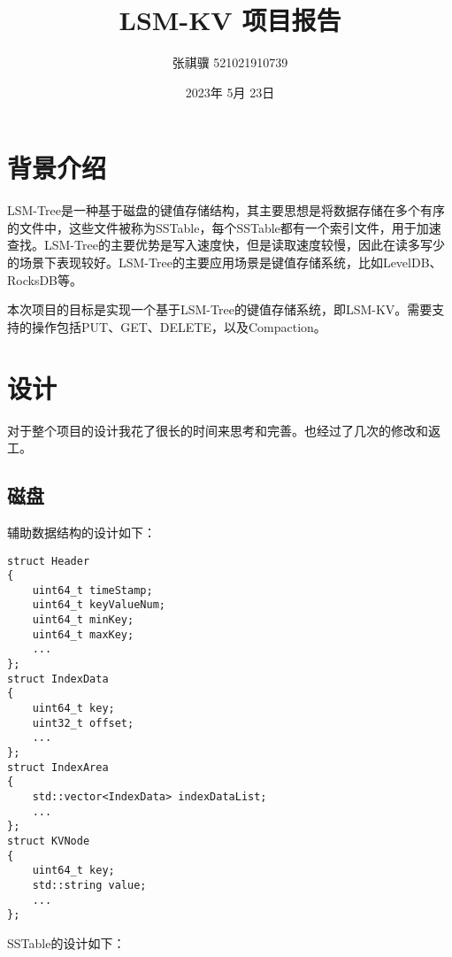 \documentclass[fontset=windows]{article}
\title{LSM-KV 项目报告}
\author{张祺骥 521021910739}
\date{2023年 5月 23日}
\begin{document}
\maketitle

\section{背景介绍}
LSM-Tree是一种基于磁盘的键值存储结构，其主要思想是将数据存储在多个有序的文件中，这些文件被称为SSTable，每个SSTable都有一个索引文件，用于加速查找。LSM-Tree的主要优势是写入速度快，但是读取速度较慢，因此在读多写少的场景下表现较好。LSM-Tree的主要应用场景是键值存储系统，比如LevelDB、RocksDB等。

本次项目的目标是实现一个基于LSM-Tree的键值存储系统，即LSM-KV。需要支持的操作包括PUT、GET、DELETE，以及Compaction。

\section{设计}

对于整个项目的设计我花了很长的时间来思考和完善。也经过了几次的修改和返工。

\subsection{磁盘}

辅助数据结构的设计如下：

\begin{lstlisting}
struct Header
{
    uint64_t timeStamp;
    uint64_t keyValueNum;
    uint64_t minKey;
    uint64_t maxKey;
    ...
};
struct IndexData
{
    uint64_t key;
    uint32_t offset;
    ...
};
struct IndexArea
{
    std::vector<IndexData> indexDataList;
    ...
};
struct KVNode
{
    uint64_t key;
    std::string value;
    ...
};
\end{lstlisting}

SSTable的设计如下：
\end{document}
